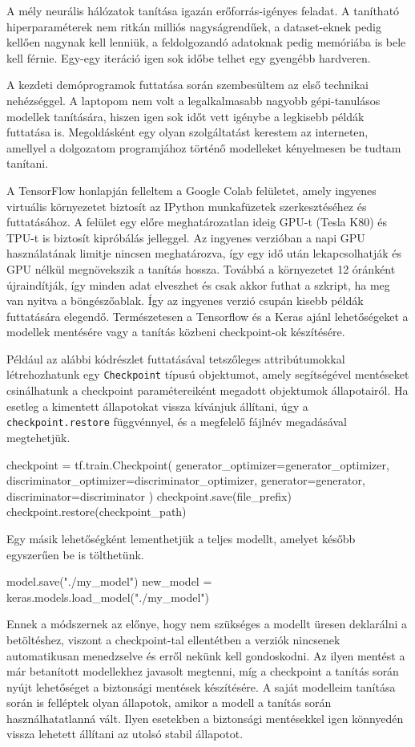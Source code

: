 
A mély neurális hálózatok tanítása igazán erőforrás-igényes feladat. A tanítható hiperparaméterek nem ritkán milliós nagyságrendűek, a dataset-eknek pedig kellően nagynak kell lenniük, a feldolgozandó adatoknak pedig memóriába is bele kell férnie. Egy-egy iteráció igen sok időbe telhet egy gyengébb hardveren.

A kezdeti demóprogramok futtatása során szembesültem az első technikai nehézséggel. A laptopom nem volt a legalkalmasabb nagyobb gépi-tanulásos modellek tanítására, hiszen igen sok időt vett igénybe a legkisebb példák futtatása is. Megoldásként egy olyan szolgáltatást kerestem az interneten, amellyel a dolgozatom programjához történő modelleket kényelmesen be tudtam tanítani.

A TensorFlow honlapján felleltem a Google Colab \cite{colab} felületet, amely ingyenes virtuális környezetet biztosít az IPython munkafüzetek szerkesztéséhez és futtatásához. A felület egy előre meghatározatlan ideig GPU-t (Tesla K80) és TPU-t is biztosít kipróbálás jelleggel. Az ingyenes verzióban a napi GPU használatának limitje nincsen meghatározva, így egy idő után lekapcsolhatják és GPU nélkül megnövekszik a tanítás hossza. Továbbá a környezetet 12 óránként újraindítják, így minden adat elveszhet és csak akkor futhat a szkript, ha meg van nyitva a böngészőablak. Így az ingyenes verzió csupán kisebb példák futtatására elegendő. Természetesen a Tensorflow és a Keras ajánl lehetőségeket a modellek mentésére vagy a tanítás közbeni checkpoint-ok készítésére.

Például az alábbi kódrészlet futtatásával tetszőleges attribútumokkal létrehozhatunk egy \texttt{Checkpoint} típusú objektumot, amely segítségével mentéseket csinálhatunk a checkpoint paramétereiként megadott objektumok állapotairól. Ha esetleg a kimentett állapotokat vissza kívánjuk állítani, úgy a \texttt{checkpoint.restore} függvénnyel, és a megfelelő fájlnév megadásával megtehetjük.
\begin{python}
checkpoint = tf.train.Checkpoint(
    generator_optimizer=generator_optimizer,
    discriminator_optimizer=discriminator_optimizer,
    generator=generator,
    discriminator=discriminator
)
checkpoint.save(file_prefix)
checkpoint.restore(checkpoint_path)
\end{python}

Egy másik lehetőségként lementhetjük a teljes modellt, amelyet később egyszerűen be is tölthetünk.
\begin{python}
model.save("./my_model")
new_model = keras.models.load_model("./my_model")
\end{python}
Ennek a módszernek az előnye, hogy nem szükséges a modellt üresen deklarálni a betöltéshez, viszont a checkpoint-tal ellentétben a verziók nincsenek automatikusan menedzselve és erről nekünk kell gondoskodni. Az ilyen mentést a már betanított modellekhez javasolt megtenni, míg a checkpoint a tanítás során nyújt lehetőséget a biztonsági mentések készítésére. A saját modelleim tanítása során is felléptek olyan állapotok, amikor a modell a tanítás során használhatatlanná vált. Ilyen esetekben a biztonsági mentésekkel igen könnyedén vissza lehetett állítani az utolsó stabil állapotot.

